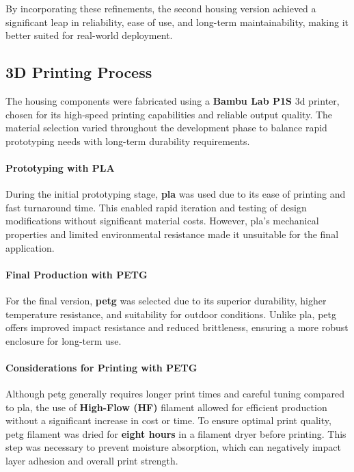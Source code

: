 By incorporating these refinements, the second housing version achieved a significant leap in reliability, ease of use, and long-term maintainability, making it better suited for real-world deployment.  

\subsection{3D Printing Process}  

The housing components were fabricated using a \textbf{Bambu Lab P1S} \acrshort{3d} printer, chosen for its high-speed printing capabilities and reliable output quality. The material selection varied throughout the development phase to balance rapid prototyping needs with long-term durability requirements.  

\paragraph{Prototyping with PLA}  
During the initial prototyping stage, \textbf{\acrfull{pla}} was used due to its ease of printing and fast turnaround time. This enabled rapid iteration and testing of design modifications without significant material costs. However, \acrshort{pla}'s mechanical properties and limited environmental resistance made it unsuitable for the final application.  

\paragraph{Final Production with PETG}  
For the final version, \textbf{\acrfull{petg}} was selected due to its superior durability, higher temperature resistance, and suitability for outdoor conditions. Unlike \acrshort{pla}, \acrshort{petg} offers improved impact resistance and reduced brittleness, ensuring a more robust enclosure for long-term use.  

\paragraph{Considerations for Printing with PETG}  
Although \acrshort{petg} generally requires longer print times and careful tuning compared to \acrshort{pla}, the use of \textbf{High-Flow (HF)} filament allowed for efficient production without a significant increase in cost or time. To ensure optimal print quality, \acrshort{petg} filament was dried for \textbf{eight hours} in a filament dryer before printing. This step was necessary to prevent moisture absorption, which can negatively impact layer adhesion and overall print strength.  

